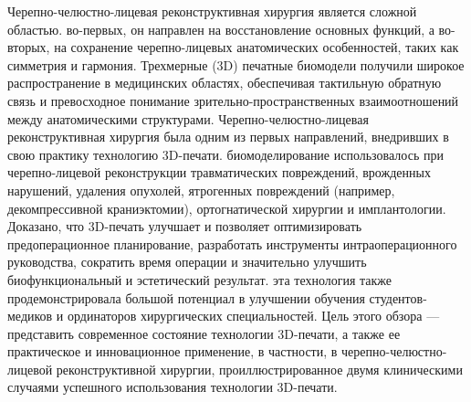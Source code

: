 Черепно-челюстно-лицевая реконструктивная хирургия является сложной областью.
во-первых, он направлен на восстановление основных функций, а во-вторых, на
сохранение черепно-лицевых анатомических особенностей, таких как симметрия и
гармония. Трехмерные (3D) печатные биомодели получили широкое распространение в
медицинских областях, обеспечивая тактильную обратную связь и превосходное
понимание зрительно-пространственных взаимоотношений между анатомическими
структурами. Черепно-челюстно-лицевая реконструктивная хирургия была одним из
первых направлений, внедривших в свою практику технологию 3D-печати.
биомоделирование использовалось при черепно-лицевой реконструкции травматических
повреждений, врожденных нарушений, удаления опухолей, ятрогенных повреждений
(например, декомпрессивной краниэктомии), ортогнатической хирургии и
имплантологии. Доказано, что 3D-печать улучшает и позволяет оптимизировать
предоперационное планирование, разработать инструменты интраоперационного
руководства, сократить время операции и значительно улучшить биофункциональный и
эстетический результат. эта технология также продемонстрировала большой
потенциал в улучшении обучения студентов-медиков и ординаторов хирургических
специальностей. Цель этого обзора — представить современное состояние технологии
3D-печати, а также ее практическое и инновационное применение, в частности, в
черепно-челюстно-лицевой реконструктивной хирургии, проиллюстрированное двумя
клиническими случаями успешного использования технологии 3D-печати.\cite{matias2017}


